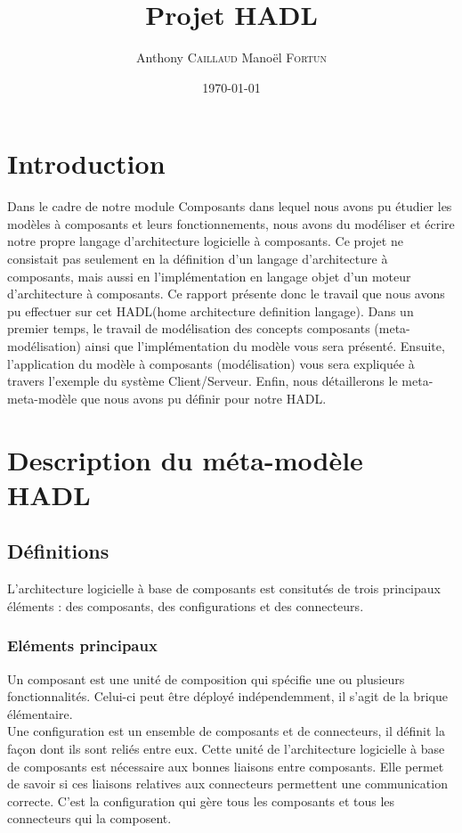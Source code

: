 \documentclass[11pt,a4paper]{article}
\title{Projet HADL}
\author{Anthony \textsc{Caillaud} Manoël \textsc{Fortun}}
\date{\today}
\begin{document}
\maketitle


\clearpage
\tableofcontents
\clearpage
\section{Introduction}

Dans le cadre de notre module Composants dans lequel nous avons pu étudier les
modèles à composants et leurs fonctionnements, nous avons du modéliser et écrire
notre propre langage d'architecture logicielle à composants. Ce projet ne
consistait pas seulement en la définition d'un langage d'architecture à
composants, mais aussi en l'implémentation en langage objet d'un moteur
d'architecture à composants. Ce rapport présente donc le travail que nous avons
pu effectuer sur cet HADL(home architecture definition langage). Dans un
premier temps, le travail de modélisation des concepts composants
(meta-modélisation) ainsi que l'implémentation du modèle vous sera présenté.
Ensuite, l'application du modèle à composants (modélisation) vous sera
expliquée à travers l'exemple du système Client/Serveur. Enfin, nous
détaillerons le meta-meta-modèle que nous avons pu définir pour notre HADL.


\section{Description du méta-modèle HADL}
\subsection{Définitions}
L'architecture logicielle à base de composants est consitutés de trois
principaux éléments : des composants, des configurations et des connecteurs.\\

\subsubsection{Eléments principaux}

 Un composant est une unité de composition qui spécifie une ou plusieurs
 fonctionnalités. Celui-ci peut être déployé indépendemment, il s'agit de la
 brique élémentaire.\\

Une configuration est un ensemble de composants et de connecteurs, il définit la
façon dont ils sont reliés entre eux. Cette unité de l'architecture logicielle
à base de composants est nécessaire aux bonnes liaisons entre composants. Elle
permet de savoir si ces liaisons relatives aux connecteurs permettent une
communication correcte. C'est la configuration qui gère tous les composants et
tous les connecteurs qui la composent.\\
\end{document}
